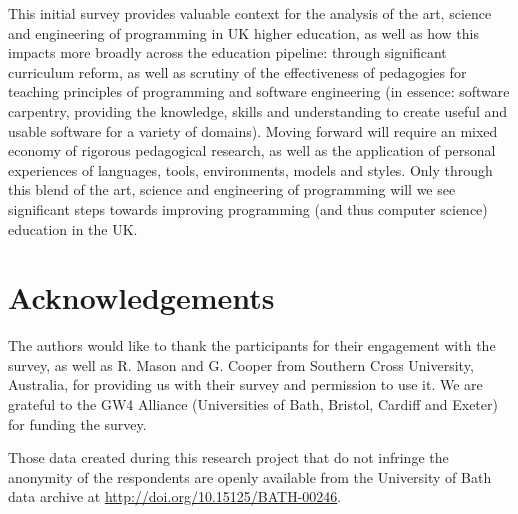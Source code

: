\documentclass[english]{programming}
\begin{document}
This initial survey provides valuable context for the analysis of the
art, science and engineering of programming in UK higher education, as
well as how this impacts more broadly across the education pipeline:
through significant curriculum reform, as well as scrutiny of the
effectiveness of pedagogies for teaching principles of programming and
software engineering (in essence: software carpentry, providing the
knowledge, skills and understanding to create useful and usable
software for a variety of domains). Moving forward will require an
mixed economy of rigorous pedagogical research, as well as the
application of personal experiences of languages, tools, environments,
models and styles. Only through this blend of the art, science and
engineering of programming will we see significant steps towards
improving programming (and thus computer science) education in the UK.

\section*{Acknowledgements}

The authors would like to thank the participants for their engagement
with the survey, as well as R. Mason and G. Cooper from Southern Cross
University, Australia, for providing us with their survey and
permission to use it. We are grateful to the GW4 Alliance
(Universities of Bath, Bristol, Cardiff and Exeter) for funding the
survey.

Those data created during this research project that do not infringe
the anonymity of the respondents are openly available from the
University of Bath data archive at
\url{http://doi.org/10.15125/BATH-00246}.


\end{document}
